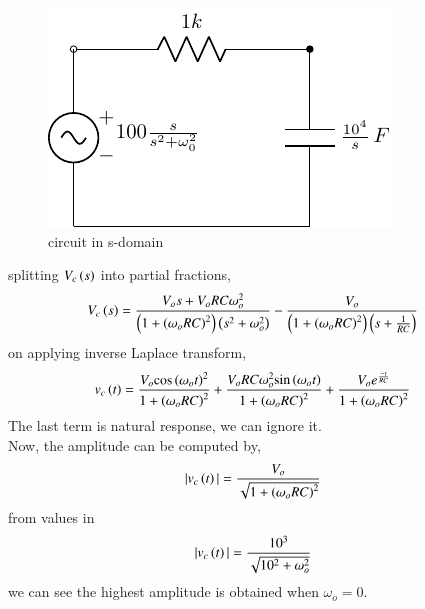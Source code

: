 \documentclass[journal,12pt,twocolumn]{IEEEtran}
\theoremstyle{remark}
\begin{document}
\begin{figure}[h!]
    \includegraphics[width = \columnwidth]{figs/c_fig2.pdf}
    \caption{circuit in s-domain }
    \centering
    \label{fig: bm_16_fig_2}
\end{figure}
splitting $ V_c\left(s\right)$ into partial fractions,
\begin{align}
V_c\left(s\right) &= \frac{V_os + V_oRC\omega_o^2}{\left(1+\left(\omega_oRC\right)^2\right)\left(s^2+\omega_o^2\right)}-\frac{V_o}{\left(1+\left(\omega_oRC\right)^2\right)\left(s+\frac{1}{RC}\right)}
\end{align}
on applying inverse Laplace transform,
\begin{align}
v_c\left(t\right)&= \frac{V_o\text{cos}\left(\omega_o t\right)^2}{1+\left(\omega_oRC\right)^2}+\frac{V_oRC\omega_o^2\text{sin}\left(\omega_o t\right)}{1+\left(\omega_oRC\right)^2}+\frac{V_oe^{\frac{-t}{RC}}}{1+\left(\omega_oRC\right)^2}
\end{align}
\vspace{3cm}
The last term is natural response, we can ignore it.\\
Now, the amplitude can be computed by,
\begin{align}
|v_c\left(t\right)| &= \frac{V_o}{\sqrt{1+\left(\omega_oRC\right)^2}}
\end{align}
from values in 
\begin{align}
|v_c\left(t\right)| &= \frac{10^3}{\sqrt{10^2+\omega_o^2}}
\end{align}
we can see the highest amplitude is obtained when $ \omega_o = 0$.
\end{document}
